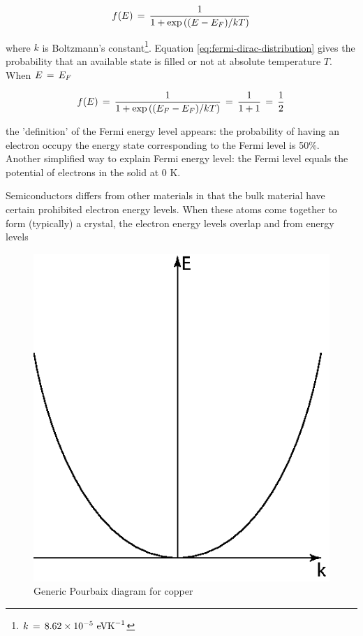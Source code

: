 {\begin{align}
f(E) \,=\, \dfrac{1}{1+\text{exp}\left( (E-E_F)/kT \right)}
\label{eq:fermi-dirac-distribution}
\end{align}

where $k$ is Boltzmann's constant\footnote{$k\,=\, 8.62\times10^{-5}\text{ eVK}^{-1}$}. Equation \ref{eq:fermi-dirac-distribution} gives the probability that an available state is filled or not at absolute temperature $T$. When $E\,=\, E_F$

\begin{align}
f(E) \,=\, \dfrac{1}{1+\text{exp}\left( (E_F-E_F)/kT \right)} \,=\, \dfrac{1}{1+1} \,=\, \dfrac{1}{2}
\end{align}

the 'definition' of the Fermi energy level appears: the probability of having an electron occupy the energy state corresponding to the Fermi level is 50\%. \citep{Streetman2015} Another simplified way to explain Fermi energy level: the Fermi level equals the potential of electrons in the solid at 0 K. 




Semiconductors differs from other materials in that the bulk material have certain prohibited electron energy levels. When these atoms come together to form (typically) a crystal, the electron energy levels overlap and from energy levels

	\begin{figure}
		\centering
		\includegraphics[scale=1]{Figures/Parabolic_energy.eps}
		\caption{Generic Pourbaix diagram for copper}
		\label{fig:pourbaix_generic}
	\end{figure}

}
